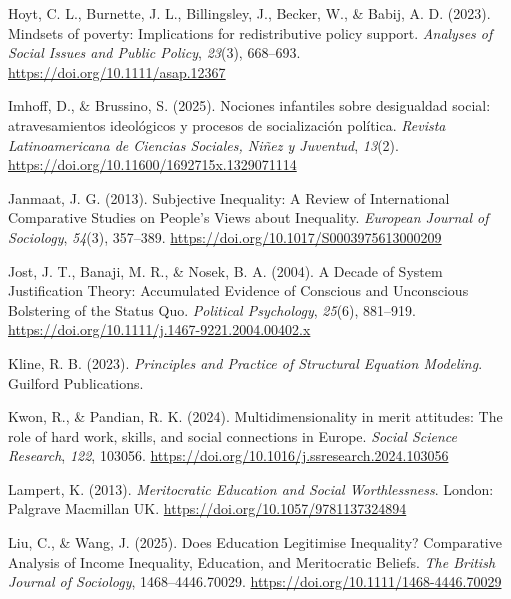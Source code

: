 \documentclass[
  13pt,
]{article}
\newlength{\cslhangindent}
\newenvironment{CSLReferences}[2] %
 {\begin{list}{}{%
  \setlength{\itemindent}{0pt}
  \setlength{\leftmargin}{0pt}
  \setlength{\parsep}{0pt}
  \ifodd #1
   \setlength{\leftmargin}{\cslhangindent}
   \setlength{\itemindent}{-1\cslhangindent}
  \fi
  \setlength{\itemsep}{#2\baselineskip}}}
 {\end{list}}
\begin{document}
\begin{CSLReferences}{1}{0}
Hoyt, C. L., Burnette, J. L., Billingsley, J., Becker, W., \& Babij, A.
D. (2023). Mindsets of poverty: {Implications} for redistributive policy
support. \emph{Analyses of Social Issues and Public Policy},
\emph{23}(3), 668--693. \url{https://doi.org/10.1111/asap.12367}

Imhoff, D., \& Brussino, S. (2025). {Nociones infantiles sobre
desigualdad social: atravesamientos ideológicos y procesos de
socialización política}. \emph{Revista Latinoamericana de Ciencias
Sociales, Niñez y Juventud}, \emph{13}(2).
\url{https://doi.org/10.11600/1692715x.1329071114}

Janmaat, J. G. (2013). Subjective {Inequality}: A {Review} of
{International Comparative Studies} on {People}'s {Views} about
{Inequality}. \emph{European Journal of Sociology}, \emph{54}(3),
357--389. \url{https://doi.org/10.1017/S0003975613000209}

Jost, J. T., Banaji, M. R., \& Nosek, B. A. (2004). A {Decade} of
{System Justification Theory}: {Accumulated Evidence} of {Conscious} and
{Unconscious Bolstering} of the {Status Quo}. \emph{Political
Psychology}, \emph{25}(6), 881--919.
\url{https://doi.org/10.1111/j.1467-9221.2004.00402.x}

Kline, R. B. (2023). \emph{Principles and {Practice} of {Structural
Equation Modeling}}. Guilford Publications.

Kwon, R., \& Pandian, R. K. (2024). Multidimensionality in merit
attitudes: {The} role of hard work, skills, and social connections in
{Europe}. \emph{Social Science Research}, \emph{122}, 103056.
\url{https://doi.org/10.1016/j.ssresearch.2024.103056}

Lampert, K. (2013). \emph{Meritocratic {Education} and {Social
Worthlessness}}. London: Palgrave Macmillan UK.
\url{https://doi.org/10.1057/9781137324894}

Liu, C., \& Wang, J. (2025). Does {Education Legitimise Inequality}?
{Comparative Analysis} of {Income Inequality}, {Education}, and
{Meritocratic Beliefs}. \emph{The British Journal of Sociology},
1468--4446.70029. \url{https://doi.org/10.1111/1468-4446.70029}


\end{CSLReferences}
\end{document}
